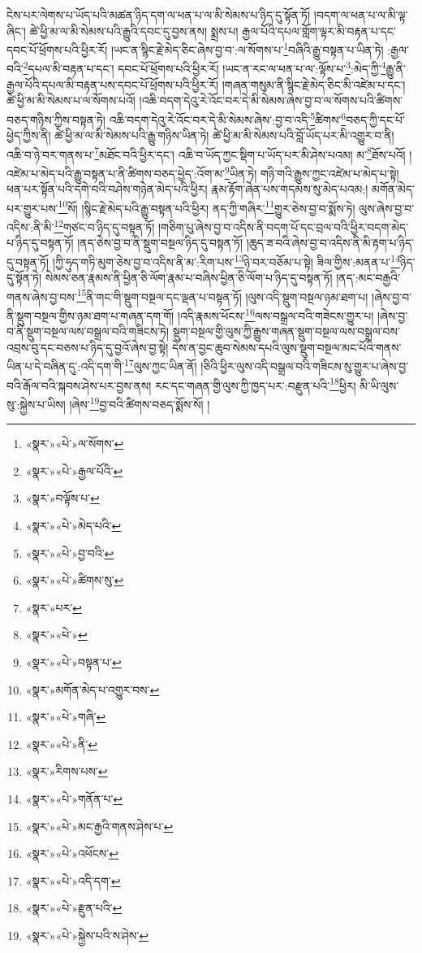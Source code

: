 ངེས་པར་ལེགས་པ་ཡོད་པའི་མཚན་ཉིད་དག་ལ་ཕན་པ་ལ་མི་སེམས་པ་ཉིད་དུ་སྟོན་ཏོ། །བདག་ལ་ཕན་པ་ལ་མི་ལྟ་ཞིང་། ཚེ་ཕྱི་མ་ལ་མི་སེམས་པའི་རྒྱུའི་དབང་དུ་བྱས་ནས། སྨྲས་པ། རྒྱལ་པོའི་དཔལ་གློག་ལྟར་མི་བརྟན་པ་དང་དབང་པོ་ཕྲོགས་པའི་ཕྱིར་རོ། །ཡང་ན་སྙིང་རྗེ་མེད་ཅིང་ཞེས་བྱ་བ་:ལ་སོགས་པ་\footnote{«སྣར་»«པེ་»ལ་སོགས་}བཞིའི་རྒྱུ་བསྟན་པ་ཡིན་ཏེ། :རྒྱལ་བའི་\footnote{«སྣར་»«པེ་»རྒྱལ་པོའི་}དཔལ་མི་བརྟན་པ་དང་། དབང་པོ་ཕྲོགས་པའི་ཕྱིར་རོ། །ཡང་ན་རང་ལ་ཕན་པ་ལ་:ལྟོས་པ་\footnote{«སྣར་»བལྟོས་པ་}:མེད་ཀྱི་\footnote{«སྣར་»«པེ་»མེད་པའི་}རྒྱུ་ནི་རྒྱལ་པོའི་དཔལ་མི་བརྟན་པས་དབང་པོ་ཕྲོགས་པའི་ཕྱིར་རོ། །གཞན་གསུམ་ནི་སྙིང་རྗེ་མེད་ཅིང་མི་འཛེམ་པ་དང་། ཚེ་ཕྱི་མ་མི་སེམས་པ་ལ་སོགས་པའོ། །འཆི་བདག་དེའུ་རེ་འོང་བར་དེ་མི་སེམས་ཞེས་བྱ་བ་ལ་སོགས་པའི་ཚིགས་བཅད་གཉིས་ཀྱིས་བསྟན་ཏེ། འཆི་བདག་དེའུ་རེ་འོང་བར་དེ་མི་སེམས་ཞེས་:བྱ་བ་འདི་\footnote{«སྣར་»«པེ་»བྱ་བའི་}ཚིགས་\footnote{«སྣར་»«པེ་»ཚིགས་སུ་}བཅད་ཀྱི་དང་པོ་ཕྱེད་ཀྱིས་ནི། ཚེ་ཕྱི་མ་ལ་མི་སེམས་པའི་རྒྱུ་གཉིས་ཡིན་ཏེ། ཚེ་ཕྱི་མ་མི་སེམས་པའི་བློ་ཡོད་པར་མི་འགྱུར་བ་ནི། འཆི་བ་ཉེ་བར་གནས་པ་\footnote{«སྣར་»པར་}མཐོང་བའི་ཕྱིར་དང་། འཆི་བ་ཡོད་ཀྱང་སྡིག་པ་ཡོད་པར་མི་ཤེས་པའམ། མ་\footnote{«སྣར་»«པེ་»}ཐོས་པའོ། །འཛེམ་པ་མེད་པའི་རྒྱུ་བསྟན་པ་ནི་ཚིགས་བཅད་ཕྱེད་:འོག་མ་\footnote{«སྣར་»«པེ་»བསྟན་པ་}ཡིན་ཏེ། གཉི་གའི་རྒྱུས་ཀྱང་འཛེམ་པ་མེད་པ་སྟེ། ཕན་པར་སྟོན་པའི་དགེ་བའི་བཤེས་གཉེན་མེད་པའི་ཕྱིར། རྣམ་རྟོག་ཞེན་པས་གདམས་སུ་མེད་པའམ:། མགོན་མེད་པར་གྱུར་པས་\footnote{«སྣར་»མགོན་མེད་པ་འགྱུར་བས་}སོ། །སྙིང་རྗེ་མེད་པའི་རྒྱུ་བསྟན་པའི་ཕྱིར། ནད་ཀྱི་གཞིར་\footnote{«སྣར་»«པེ་»གཞི་}གྱུར་ཅེས་བྱ་བ་སྨོས་ཏེ། ལུས་ཞེས་བྱ་བ་འདིས་:ནི་མི་\footnote{«སྣར་»«པེ་»ནི་}གཙང་བ་ཉིད་དུ་བསྟན་ཏོ། །གཅིག་པུ་ཞེས་བྱ་བ་འདིས་ནི་བདག་པོ་དང་བྲལ་བའི་ཕྱིར་བདག་མེད་པ་ཉིད་དུ་བསྟན་ཏོ། །ནད་ཅེས་བྱ་བ་ནི་སྡུག་བསྔལ་ཉིད་དུ་བསྟན་ཏོ། །ཆུད་ཟ་བའི་ཞེས་བྱ་བ་འདིས་ནི་མི་རྟག་པ་ཉིད་དུ་བསྟན་ཏོ། །ཀྱི་ཧུད་གཏི་མུག་ཅེས་བྱ་བ་འདིས་ནི་མ་:རིག་པས་\footnote{«སྣར་»རིགས་པས་}ཉེ་བར་བཅོམ་པ་སྟེ། ཟིལ་གྱིས་:མནན་པ་\footnote{«སྣར་»«པེ་»གནོན་པ་}ཉིད་དུ་སྟོན་ཏེ། སེམས་ཅན་རྣམས་ནི་ཕྱིན་ཅི་ལོག་རྣམ་པ་བཞིས་ཕྱིན་ཅི་ལོག་པ་ཉིད་དུ་བསྟན་ཏོ། །ནད་:མང་བརྒྱའི་གནས་ཞེས་བྱ་བས་\footnote{«སྣར་»«པེ་»མང་རྒྱའི་གནས་ཤེས་པ་}ནི་གང་གི་སྡུག་བསྔལ་དང་ལྡན་པ་བསྟན་ཏོ། །ལུས་འདི་སྡུག་བསྔལ་ཉམ་ཐག་པ། །ཞེས་བྱ་བ་ནི་སྡུག་བསྔལ་གྱིས་ཉམ་ཐག་པ་གཞན་དག་གོ། །འདི་རྣམས་ཕོངས་\footnote{«སྣར་»«པེ་»འཕོངས་}ལས་བསྒྲལ་བའི་གཟེངས་གྱུར་པ། །ཞེས་བྱ་བ་ནི་སྡུག་བསྔལ་ལས་བསྒྲལ་བའི་གཟིངས་ཏེ། སྡུག་བསྔལ་གྱི་ལུས་ཀྱི་རྒྱུས་གཞན་སྡུག་བསྔལ་ལས་བསྒྲལ་བས་འབྲས་བུ་དང་བཅས་པ་ཉིད་དུ་བྱའོ་ཞེས་བྱ་སྟེ། དེས་ན་བྱང་ཆུབ་སེམས་དཔའི་ལུས་སྡུག་བསྔལ་མང་པོའི་གནས་ཡིན་པ་དེ་བཞིན་དུ་:འདི་དག་གི་\footnote{«སྣར་»«པེ་»འདི་དག་}ལུས་ཀྱང་ཡིན་ནོ། །ཅིའི་ཕྱིར་ལུས་འདི་བསྒྲལ་བའི་གཟིངས་སུ་གྱུར་པ་ཞེས་བྱ་བའི་རྒོལ་བའི་སྐབས་ཤེས་པར་བྱས་ནས། རང་དང་གཞན་གྱི་ལུས་ཀྱི་ཁྱད་པར་:བརྫུན་པའི་\footnote{«སྣར་»«པེ་»རྫུན་པའི་}ཕྱིར། མི་ཡི་ལུས་སུ་:སྐྱེས་པ་ཡིས། །ཞེས་\footnote{«སྣར་»«པེ་»སྐྱེས་པའི་ས་ཤེས་}བྱ་བའི་ཚིགས་བཅད་སྨོས་སོ། །
